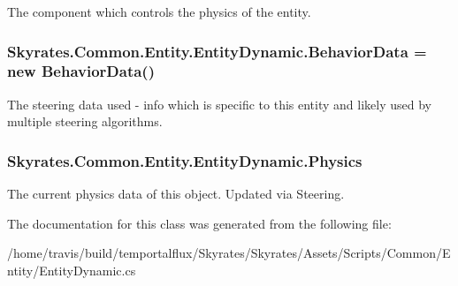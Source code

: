 The component which controls the physics of the entity. 

\hypertarget{class_skyrates_1_1_common_1_1_entity_1_1_entity_dynamic_a8b6d04f21affcb2359457f7998313663}{
\subsubsection[{Behavior\-Data}]{ Skyrates.\-Common.\-Entity.\-Entity\-Dynamic.\-Behavior\-Data = new {\bf Behavior\-Data}()}}\label{class_skyrates_1_1_common_1_1_entity_1_1_entity_dynamic_a8b6d04f21affcb2359457f7998313663}


The steering data used -\/ info which is specific to this entity and likely used by multiple steering algorithms. 

\hypertarget{class_skyrates_1_1_common_1_1_entity_1_1_entity_dynamic_a2cc825f563606d4d565a4b0de1feab19}{
\subsubsection[{Physics}]{ Skyrates.\-Common.\-Entity.\-Entity\-Dynamic.\-Physics}}\label{class_skyrates_1_1_common_1_1_entity_1_1_entity_dynamic_a2cc825f563606d4d565a4b0de1feab19}


The current physics data of this object. Updated via Steering. 



The documentation for this class was generated from the following file\-:\begin{DoxyCompactItemize}
\item 
/home/travis/build/temportalflux/\-Skyrates/\-Skyrates/\-Assets/\-Scripts/\-Common/\-Entity/Entity\-Dynamic.\-cs\end{DoxyCompactItemize}
